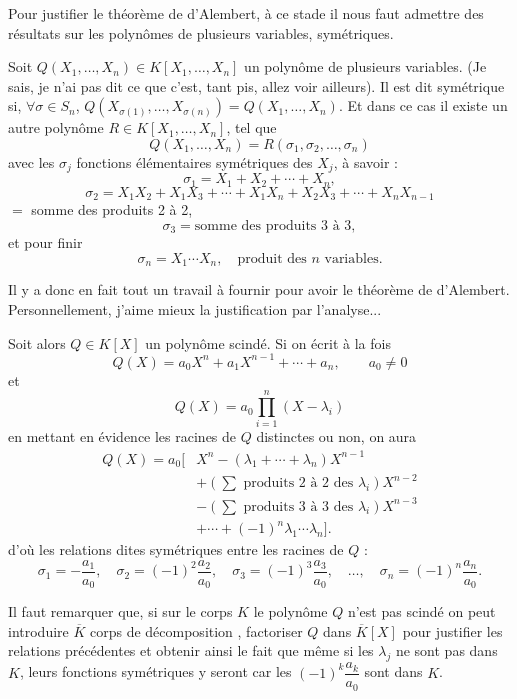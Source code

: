 Pour justifier le théorème de d'Alembert, à ce stade il nous faut admettre des résultats sur les polynômes de plusieurs variables, symétriques.

Soit $Q(X_1,\ldots,X_n)\in K[X_1,\ldots,X_n]$ un polynôme de plusieurs variables. (Je sais, je n'ai pas dit ce que c'est, tant pis, allez voir ailleurs). Il est dit symétrique si, $\forall\sigma\in S_n$, $Q(X_{\sigma(1)},\ldots,X_{\sigma(n)})=Q(X_1,\ldots,X_n)$. Et dans ce cas il existe un autre polynôme $R\in K[X_1,\ldots,X_n]$, tel que
\[
Q(X_1,\ldots,X_n)=R(\sigma_1,\sigma_2,\ldots,\sigma_n)
\]
avec les $\sigma_j$ fonctions élémentaires symétriques des $X_j$, à savoir :
\[
\sigma_1=X_1+X_2+\cdots+X_n,
\]
\[
\sigma_2=X_1X_2+X_1X_3+\cdots+X_1X_n+X_2X_3+\cdots+X_nX_{n-1}
\]
$=$ somme des produits 2 à 2,
\[
\sigma_3=\text{somme des produits 3 à 3},
\]
et pour finir
\[
\sigma_n=X_1\cdots X_n,\quad\text{produit des }n\text{ variables.}
\]

Il y a donc en fait tout un travail à fournir pour avoir le théorème de d'Alembert. Personnellement, j'aime mieux la justification par l'analyse...

Soit alors $Q\in K[X]$ un polynôme scindé. Si on écrit à la fois
\[
Q(X)=a_0X^n+a_1X^{n-1}+\cdots+a_n,\qquad a_0\ne0
\]
et
\[
Q(X)=a_0\prod_{i=1}^n(X-\lambda_i)
\]
en mettant en évidence les racines de $Q$ distinctes ou non, on aura
\[
\begin{aligned}
Q(X)=a_0[&X^n-(\lambda_1+\cdots+\lambda_n)X^{n-1}\\
&+(\sum\text{ produits 2 à 2 des }\lambda_i)X^{n-2}\\
&-(\sum\text{ produits 3 à 3 des }\lambda_i)X^{n-3}\\
&+\cdots+(-1)^n\lambda_1\cdots\lambda_n].
\end{aligned}
\]
d'où les relations dites symétriques entre les racines de $Q$ :
\[
\tag{7.73}
\sigma_1=-\frac{a_1}{a_0},\quad
\sigma_2=(-1)^2\frac{a_2}{a_0},\quad
\sigma_3=(-1)^3\frac{a_3}{a_0},\quad\ldots,\quad
\sigma_n=(-1)^n\frac{a_n}{a_0}.
\]

Il faut remarquer que, si sur le corps $K$ le polynôme $Q$ n'est pas scindé on peut introduire $\overline K$ corps de décomposition  , factoriser $Q$ dans $\overline K[X]$ pour justifier les relations précédentes et obtenir ainsi le fait que même si les $\lambda_j$ ne sont pas dans $K$, leurs fonctions symétriques y seront car les $(-1)^k\dfrac{a_k}{a_0}$ sont dans $K$.

